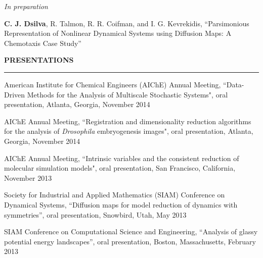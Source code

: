 \documentclass[letterpaper,10pt]{article}
\newenvironment{itemize*}
  {\begin{itemize}
    \setlength{\parskip}{-2pt}}
  {\end{itemize}}
\newcommand{\cvheading}[1]{
\vspace{0.11in}
\noindent
\MakeUppercase{\bf #1}
\vspace{0.05in}
{\hrule height 0.3mm}
\vspace{0.05in}}
\begin{document}
{\em In preparation}

\begin{itemize*}
\item {\bf C. J. Dsilva}, R. Talmon, R. R. Coifman, and I. G. Kevrekidis, ``Parsimonious Representation of Nonlinear Dynamical Systems using Diffusion Maps: A Chemotaxis Case Study''
\end{itemize*}

\cvheading{Presentations}
\begin{itemize*}
\item American Institute for Chemical Engineers (AIChE) Annual Meeting,  ``Data-Driven Methods for the Analysis of Multiscale Stochastic Systems", oral presentation, Atlanta, Georgia, November 2014
\item AIChE Annual Meeting,  ``Registration and dimensionality reduction algorithms for the analysis of {\em Drosophila} embryogenesis images", oral presentation, Atlanta, Georgia, November 2014
\item AIChE Annual Meeting,  ``Intrinsic variables and the consistent reduction of molecular simulation models", oral presentation, San Francisco, California, November 2013
\item Society for Industrial and Applied Mathematics (SIAM) Conference on Dynamical Systems, ``Diffusion maps for model reduction of dynamics with symmetries'', oral presentation, Snowbird, Utah, May 2013
\item SIAM Conference on Computational Science and Engineering, ``Analysis of glassy potential energy landscapes'', oral presentation, Boston, Massachusetts, February 2013
\end{itemize*}
\end{document}

